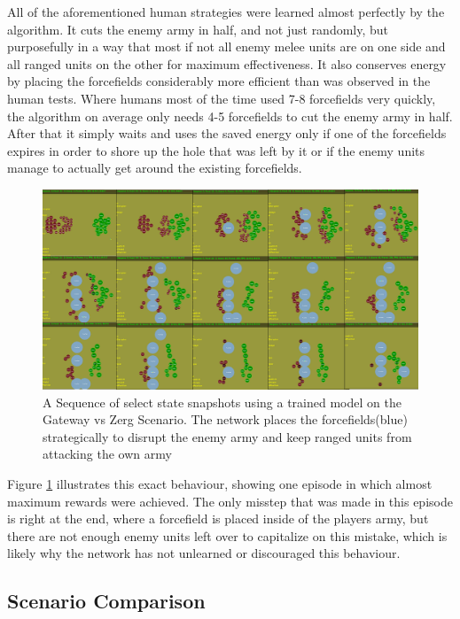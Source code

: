 All of the aforementioned human strategies were learned almost perfectly by the algorithm. It cuts the enemy army in half, and not just randomly, but purposefully in a way that most if not all enemy melee units are on one side and all ranged units on the other for maximum effectiveness. It also conserves energy by placing the forcefields considerably more efficient than was observed in the human tests. Where humans most of the time used 7-8 forcefields very quickly, the algorithm on average only needs 4-5 forcefields to cut the enemy army in half. After that it simply waits and uses the saved energy only if one of the forcefields expires in order to shore up the hole that was left by it or if the enemy units manage to actually get around the existing forcefields. 

\begin{figure}[htb]
  \centering
      \includegraphics[width=1\textwidth]{Figures/gz_strategy.png}
  \caption{ A Sequence of select state snapshots using a trained model on the Gateway vs Zerg Scenario. The network places the forcefields(blue) strategically to disrupt the enemy army and keep ranged units from attacking the own army}
  \label{fig:gzstrat}
\end{figure}

Figure \ref{fig:gzstrat} illustrates this exact behaviour, showing one episode in which almost maximum rewards were achieved. The only misstep that was made in this episode is right at the end, where a forcefield is placed inside of the players army, but there are not enough enemy units left over to capitalize on this mistake, which is likely why the network has not unlearned or discouraged this behaviour.
\subsection{Scenario Comparison}

